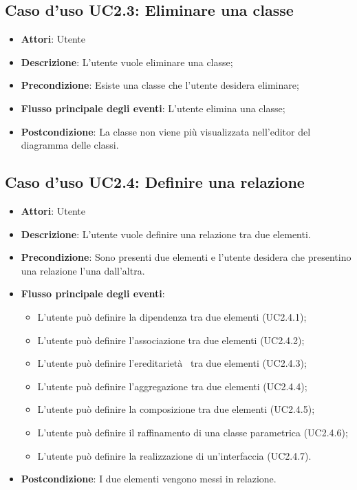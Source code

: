 \documentclass[../AnalisiDeiRequisiti.tex]{subfiles}
\begin{document}
	\subsection{Caso d'uso UC2.3: Eliminare una classe}
	\begin{itemize}
		\item \textbf{Attori}: Utente
		\item \textbf{Descrizione}: L'utente vuole eliminare una classe;
		\item \textbf{Precondizione}: Esiste una classe che l'utente desidera eliminare;
		\item \textbf{Flusso principale degli eventi}: L'utente elimina una classe;
		\item \textbf{Postcondizione}: La classe non viene più visualizzata nell'editor del diagramma delle classi.
	\end{itemize}
	\subsection{Caso d'uso UC2.4: Definire una relazione}
	\begin{itemize}
		\item \textbf{Attori}: Utente
		\item \textbf{Descrizione}: L'utente vuole definire una relazione tra due elementi.
		\item \textbf{Precondizione}: Sono presenti due elementi e l'utente desidera che presentino una relazione l'una dall'altra.
		\item \textbf{Flusso principale degli eventi}: \begin{itemize}
			\item L'utente può definire la dipendenza tra due elementi (UC2.4.1);
			\item L'utente può definire l'associazione tra due elementi (UC2.4.2);
			\item L'utente può definire l'ereditarietà  tra due elementi (UC2.4.3);
			\item L'utente può definire l'aggregazione tra due elementi (UC2.4.4);
			\item L'utente può definire la composizione tra due elementi (UC2.4.5);
			\item L'utente può definire il raffinamento di una classe parametrica (UC2.4.6);
			\item L'utente può definire la realizzazione di un'interfaccia (UC2.4.7).
		\end{itemize}
		\item \textbf{Postcondizione}: I due elementi vengono messi in relazione.
	\end{itemize}
\end{document}
